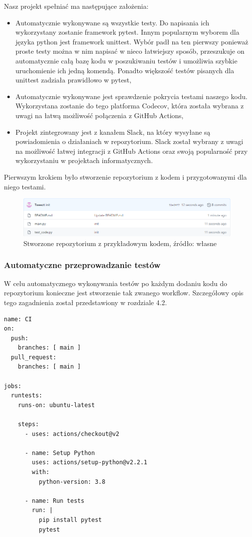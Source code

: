 Nasz projekt spełniać ma następujące założenia: 
\begin{itemize}
    \item Automatycznie wykonywane są wszystkie testy. Do napisania ich wykorzystany zostanie framework pytest. Innym popularnym wyborem dla języka python jest framework unittest. Wybór padł na ten pierwszy ponieważ proste testy można w nim napisać w nieco łatwiejszy sposób, przeszukuje on automatycznie całą bazę kodu w poszukiwaniu testów i umożliwia szybkie uruchomienie ich jedną komendą. Ponadto większość testów pisanych dla unittest zadziała prawidłowo w pytest,
    \item Automatycznie wykonywane jest sprawdzenie pokrycia testami naszego kodu. Wykorzystana zostanie do tego platforma Codecov, która została wybrana z uwagi na łatwą możliwość połączenia z GitHub Actions,
    \item Projekt zintegrowany jest z kanałem Slack, na który wysyłane są powiadomienia o działaniach w repozytorium. Slack został wybrany z uwagi na możliwość łatwej integracji z GitHub Actions oraz swoją popularność przy wykorzystaniu w projektach informatycznych. 
\end{itemize}

Pierwszym krokiem było stworzenie repozytorium z kodem i przygotowanymi dla niego testami. 

\begin{figure}[htbp]
    \centering
    \includegraphics[width=13cm]{images/testingCI1.png}
    \caption{Stworzone repozytorium z przykładowym kodem, źródło: własne}
    \label{fig:ci1}
\end{figure}

\subsubsection{Automatyczne przeprowadzanie testów}
W celu automatycznego wykonywania testów po każdym dodaniu kodu do repozytorium konieczne jest stworzenie tak zwanego workflow. Szczegółowy opis tego zagadnienia został przedstawiony w rozdziale 4.2. 

\begin{lstlisting}[caption={plik main.yaml zawierający workflow automatycznie przeprowadzający testy}]
name: CI
on:
  push:
    branches: [ main ]
  pull_request:
    branches: [ main ]

jobs:
  runtests:
    runs-on: ubuntu-latest

    steps:
      - uses: actions/checkout@v2

      - name: Setup Python
        uses: actions/setup-python@v2.2.1
        with: 
          python-version: 3.8 

      - name: Run tests
        run: |
          pip install pytest
          pytest
\end{lstlisting}

